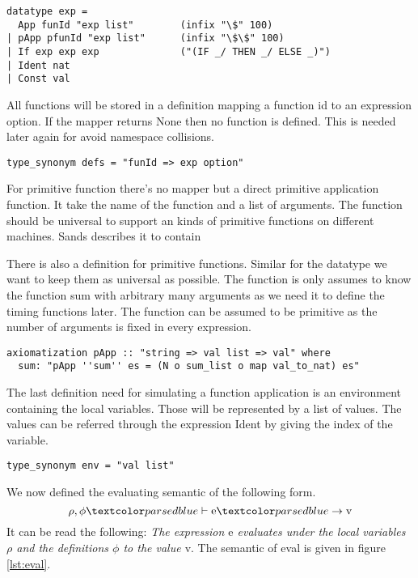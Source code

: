 \begin{lstlisting}[label=lst:exp,caption=Expression syntax,float,language=isabelle]
datatype exp =
  App funId "exp list"        (infix "\$" 100)
| pApp pfunId "exp list"      (infix "\$\$" 100)
| If exp exp exp              ("(IF _/ THEN _/ ELSE _)")
| Ident nat
| Const val
\end{lstlisting}

All functions will be stored in a definition mapping a function id to an expression option.
If the mapper returns None then no function is defined.
This is needed later again for avoid namespace collisions.
\begin{lstlisting}[mathescape=true,language=isabelle]
type_synonym defs = "funId => exp option"
\end{lstlisting}

For primitive function there's no mapper but a direct primitive application function.
It take the name of the function and a list of arguments.
The function should be universal to support an kinds of primitive functions on different machines.
Sands describes it to contain

There is also a definition for primitive functions.
Similar for the datatype we want to keep them as universal as possible.
The function is only assumes to know the function sum with arbitrary many arguments as we need it to define
the timing functions later.
The function can be assumed to be primitive as the number of arguments is fixed in every expression.
\begin{lstlisting}[mathescape=true,language=isabelle]
axiomatization pApp :: "string => val list => val" where
  sum: "pApp ''sum'' es = (N o sum_list o map val_to_nat) es"
\end{lstlisting}

The last definition need for simulating a function application is an environment containing the local variables.
Those will be represented by a list of values.
The values can be referred through the expression Ident by giving the index of the variable.
\begin{lstlisting}[language=isabelle]
type_synonym env = "val list"
\end{lstlisting}

We now defined the evaluating semantic of the following form.
\begin{equation*}
  \rho, \phi \hvdash \text{e} \hrightarrow \text{v}
\end{equation*}
It can be read the following: \textit{The expression $\text{e}$ evaluates under the local variables $\rho$ and the definitions $\phi$ to the value $\text{v}$}. The semantic of eval is given in figure \ref{lst:eval}.

